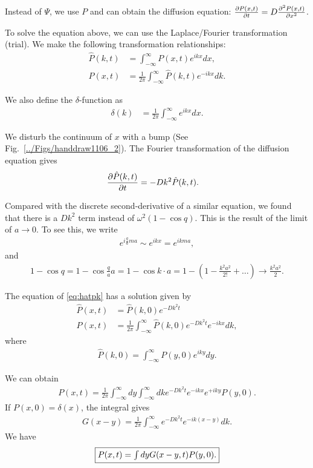 Instead of $ \Psi $, we use $ P $ and can obtain the diffusion equation: $ \frac{\partial {P(x,t)}}{\partial t} = D \frac{\partial^2 {P(x,t)}}{\partial {x}^2} $. 

To solve the equation above, we can use the Laplace/Fourier transformation (trial). We make the following transformation relationships:
\begin{align}
\hat{P} (k,t) &= \int_{-\infty}^{\infty} P(x,t) e^{ikx} dx,\\
P(x,t) &= \frac{1}{2\pi} \int_{-\infty} ^ {\infty} \hat{P}(k,t) e^{-ikx} dk. 
\end{align}

We also define the $ \delta $-function as
\begin{align}
\delta{(k)} &= \frac{1}{2\pi} \int_{-\infty} ^ {\infty} e^{ikx} dx. 
\end{align}

We disturb the continuum of $ x $ with a bump (See Fig.~\ref{../Figs/handdraw1106_2}). 
The Fourier transformation of the diffusion equation gives
\begin{align}
\frac{\partial {\hat{P}(k,t)}}{\partial t} &= -D k^2 \hat{P}(k,t). \label{eq:hatpk}
\end{align}

Compared with the discrete second-derivative of a similar equation, we found that there is a $ Dk^2 $ term instead of $ \omega ^2 (1-\cos q) $. This is the result of the limit of $ a\rightarrow 0 $. To see this, we write
\begin{align}
e^{i\frac{q}{a} ma} \sim e^{ikx}=e^{ikma},
\end{align}
and
\begin{align}
1-\cos q= 1- \cos\frac{q}{a} a = 1- \cos k\cdot a = 1- (1- \frac{k^2a^2}{2!} +\ldots ) \rightarrow \frac{k^2 a^2}{2}. 
\end{align}

The equation of \ref{eq:hatpk} has a solution given by
\begin{align}
\hat{P}(x,t) &= \hat{P} (k,0) e^{-Dk^2t}\\
P(x,t) &= \frac{1}{2\pi}\int_{-\infty}^{\infty} \hat{P}(k,0) e^{-Dk^2 t} e^{-ikx} dk,
\end{align}
where
\begin{align}
\hat{P} (k,0) = \int_{-\infty}^{\infty} P(y,0)e^{iky} dy.
\end{align}

We can obtain
\begin{align}
P(x,t) = \frac{1}{2\pi} \int_{-\infty} ^ {\infty}  dy \int_{-\infty}^{\infty} dk e^{-Dk^2t} e^{-ikx } e^{+iky} P(y,0).
\end{align}
If $ P(x,0) = \delta (x) $, the integral gives
\begin{align}
G (x-y) =  \frac{1}{2\pi} \int_{-\infty} ^ {\infty} e^{-Dk^2t}e^{-ik(x-y)} dk.
\end{align}
We have
\begin{align}
\fbox{$ P(x,t) = \int dy G(x-y,t) P(y,0) .$}
\end{align}

